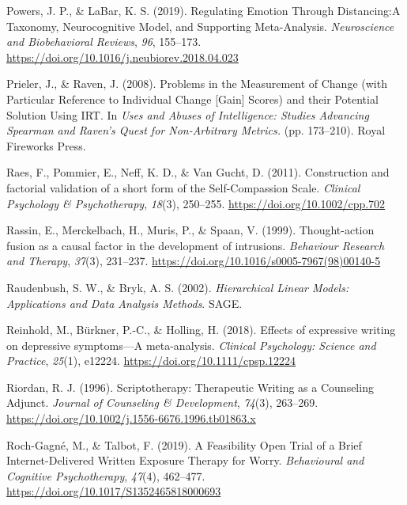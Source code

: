 \documentclass[
  man,floatsintext]{apa7}
\newlength{\cslhangindent}
\newlength{\cslentryspacingunit} %
\newenvironment{CSLReferences}[2] %
 {%
  \setlength{\parindent}{0pt}
  \ifodd #1
  \let\oldpar\par
  \def\par{\hangindent=\cslhangindent\oldpar}
  \fi
  \setlength{\parskip}{#2\cslentryspacingunit}
 }%
 {}
\begin{document}
\begin{CSLReferences}{1}{0}
\leavevmode{}%
Powers, J. P., \& LaBar, K. S. (2019). Regulating Emotion Through Distancing:A Taxonomy, Neurocognitive Model, and Supporting Meta-Analysis. \emph{Neuroscience and Biobehavioral Reviews}, \emph{96}, 155--173. \url{https://doi.org/10.1016/j.neubiorev.2018.04.023}

\leavevmode{}%
Prieler, J., \& Raven, J. (2008). Problems in the Measurement of Change (with Particular Reference to Individual Change {[}Gain{]} Scores) and their Potential Solution Using IRT. In \emph{Uses and Abuses of Intelligence: Studies Advancing Spearman and Raven's Quest for Non-Arbitrary Metrics.} (pp. 173--210). Royal Fireworks Press.

\leavevmode{}%
Raes, F., Pommier, E., Neff, K. D., \& Van Gucht, D. (2011). Construction and factorial validation of a short form of the Self-Compassion Scale. \emph{Clinical Psychology \& Psychotherapy}, \emph{18}(3), 250--255. \url{https://doi.org/10.1002/cpp.702}

\leavevmode{}%
Rassin, E., Merckelbach, H., Muris, P., \& Spaan, V. (1999). Thought-action fusion as a causal factor in the development of intrusions. \emph{Behaviour Research and Therapy}, \emph{37}(3), 231--237. \url{https://doi.org/10.1016/s0005-7967(98)00140-5}

\leavevmode{}%
Raudenbush, S. W., \& Bryk, A. S. (2002). \emph{Hierarchical Linear Models: Applications and Data Analysis Methods}. SAGE.

\leavevmode{}%
Reinhold, M., Bürkner, P.-C., \& Holling, H. (2018). Effects of expressive writing on depressive symptoms---A meta-analysis. \emph{Clinical Psychology: Science and Practice}, \emph{25}(1), e12224. \url{https://doi.org/10.1111/cpsp.12224}

\leavevmode{}%
Riordan, R. J. (1996). Scriptotherapy: Therapeutic Writing as a Counseling Adjunct. \emph{Journal of Counseling \& Development}, \emph{74}(3), 263--269. \url{https://doi.org/10.1002/j.1556-6676.1996.tb01863.x}

\leavevmode{}%
Roch-Gagné, M., \& Talbot, F. (2019). A Feasibility Open Trial of a Brief Internet-Delivered Written Exposure Therapy for Worry. \emph{Behavioural and Cognitive Psychotherapy}, \emph{47}(4), 462--477. \url{https://doi.org/10.1017/S1352465818000693}


\end{CSLReferences}
\end{document}

